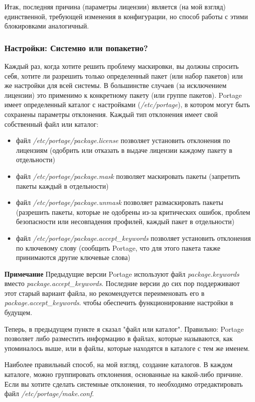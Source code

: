 \documentclass[10pt]{book}
\begin{document}
Итак, последняя причина (параметры лицензии) является (на мой взгляд) единственной, требующей изменения в конфигурации, но способ работы с этими блокировками аналогичный.

\subsubsection{Настройки: Системно или попакетно?}
Каждый раз, когда хотите решить проблему маскировки, вы должны спросить себя, хотите ли разрешить только определенный пакет (или набор пакетов) или же настройки для всей системы. В большинстве случаев (за исключением лицензии) это применимо к конкретному пакету (или группе пакетов).
Portage имеет определенный каталог с настройками (\textit{/etc/portage}), в котором могут быть сохранены параметры отклонения. Каждый тип отклонения имеет свой собственный файл или каталог:
\begin{itemize}
\item  файл \textit{/etc/portage/package.license} позволяет установить отклонения по лицензиям (одобрить или отказать в выдаче лицензии каждому пакету в отдельности)
\item файл \textit{/etc/portage/package.mask} позволяет маскировать пакеты (запретить пакеты каждый в отдельности)
\item файл \textit{/etc/portage/package.unmask} позволяет размаскировать пакеты (разрешить пакеты, которые не одобрены из-за критических ошибок, проблем безопасности или несовпадения профилей, каждый пакет в отдельности)
\item  файл \textit{/etc/portage/package.accept\_keywords } позволяет установить отклонения по ключевому слову
(сообщить Portage, что для этого пакета также принимаются другие ключевые слова)
\end{itemize}

\textbf{Примечание} 
Предыдущие версии Portage используют файл\textit{ package.keywords} вместо\textit{ package.accept\_keywords}. Последние версии до сих пор поддерживают этот старый вариант файла, но рекомендуется переименовать его в \textit{package.accept\_keywords}. чтобы обеспечить функционирование настройки в будущем.

Теперь, в предыдущем пункте я сказал "файл или каталог". Правильно: Portage позволяет либо разместить информацию в файлах, которые называются, как упоминалось выше, или в файлы, которые находятся в каталоге с тем же именем.

Наиболее правильный способ, на мой взгляд, создание каталогов. В каждом каталоге, можно группировать
отклонения, основанные на какой-либо причине.
Если вы хотите сделать системные отклонения, то необходимо отредактировать файл \textit{/etc/portage/make.conf}.
\end{document}
